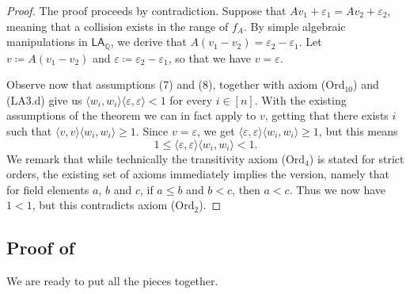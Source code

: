 \documentclass[11pt]{article}
\newcommand{\LAQ}{\mathsf{LA}_\mathbb{Q}}
\theoremstyle{definition}
\theoremstyle{plain}
\theoremstyle{remark}
\begin{document}
\begin{proof}
The proof proceeds by contradiction. Suppose that $Av_1+\varepsilon_1= Av_2+\varepsilon_2$, meaning that a collision exists in the range of $f_A$. By simple algebraic manipulations in $\LAQ$, we derive that $A(v_1-v_2)=\varepsilon_2-\varepsilon_1$. Let $v \coloneqq A(v_1-v_2)$ and $\varepsilon \coloneqq \varepsilon_2 - \varepsilon_1 $, so that we have $v = \varepsilon$. 

Observe now that assumptions (7) and (8), together with axiom ($\text{Ord}_{10}$) and (LA3.d) give us $\langle w_i, w_i \rangle \langle \varepsilon, \varepsilon \rangle < 1$ for every $i\in[n]$. With the existing assumptions of the theorem we can in fact apply  to $v$, getting that there exists $i$ such that $\langle v,v \rangle \langle w_i, w_i \rangle \geq 1$. Since $v = \varepsilon$, we get $\langle \varepsilon,\varepsilon \rangle \langle w_i, w_i \rangle \geq 1$, but this means
\[ 1 \leq \langle \varepsilon,\varepsilon \rangle \langle w_i, w_i \rangle < 1. \]
We remark that while technically the transitivity axiom ($\text{Ord}_4$) is stated for strict orders, the existing set of axioms immediately implies the  version, namely that for field elements $a$, $b$ and $c$, if $a \leq b$ and $b < c$, then $a < c$. Thus we now have $1 < 1$, but this contradicts axiom ($\text{Ord}_2$).
\end{proof}

\subsection{Proof of }
\label{subsec:proof-main}

We are ready to put all the pieces together.
\end{document}
